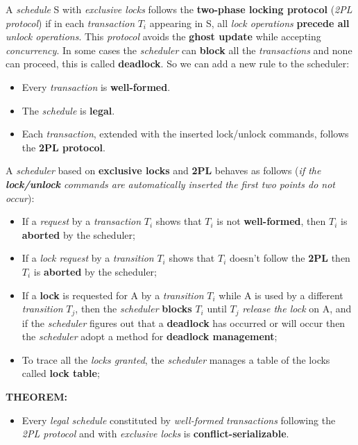 \documentclass{article}
\begin{document}
A \emph{schedule} S with \emph{exclusive locks} follows the \textbf{two-phase locking protocol} (\emph{2PL protocol}) if in each \emph{transaction} $T_i$ appearing in S, all \emph{lock operations} \textbf{precede all} \emph{unlock operations}. This \emph{protocol} avoids the \textbf{ghost update} while accepting \emph{concurrency}. In some cases the \emph{scheduler} can \textbf{block} all the \emph{transactions} and none can proceed, this is called \textbf{deadlock}. So we can add a new rule to the scheduler:
\begin{itemize}
\item Every \emph{transaction} is \textbf{well-formed}.
\item The \emph{schedule} is \textbf{legal}.
\item Each \emph{transaction}, extended with the inserted lock/unlock commands, follows the \textbf{2PL protocol}.
\end{itemize}
A \emph{scheduler} based on \textbf{exclusive locks} and \textbf{2PL} behaves as follows (\emph{if the \textbf{lock/unlock} commands are automatically inserted the first two points do not occur}):
\begin{itemize}
\item If a \emph{request} by a \emph{transaction} $T_i$ shows that $T_i$ is not\textbf{ well-formed}, then $T_i$ is \textbf{aborted} by the scheduler;
\item If a \emph{lock request} by a \emph{transition} $T_i$ shows that $T_i$ doesn't follow the \textbf{2PL} then $T_i$ is \textbf{aborted} by the scheduler;
\item If a \textbf{lock} is requested for A by a \emph{transition} $T_i$ while A is used by a different \emph{transition} $T_j$, then the \emph{scheduler} \textbf{blocks} $T_i$  until $T_j$ \emph{release the lock} on A, and if the \emph{scheduler} figures out that a \textbf{deadlock} has occurred or will occur then the \emph{scheduler} adopt a method for \textbf{deadlock management};
\item To trace all the \emph{locks granted}, the \emph{scheduler} manages a table of the locks called \textbf{lock table};
\end{itemize}
\textbf{THEOREM:}
\begin{itemize}
\item Every \emph{legal schedule} constituted by \emph{well-formed} \emph{transactions} following the \emph{2PL protocol} and with \emph{exclusive locks} is \textbf{conflict-serializable}.
\end{itemize}
\end{document}
